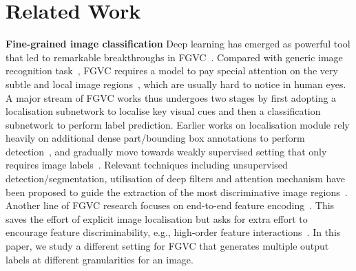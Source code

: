 \documentclass[final]{cvpr}
\newcommand{\keypoint}[1]{\vspace{0.05cm}\noindent\textbf{#1}\quad}
\begin{document}
\vspace{-2mm}
\section{Related Work}


\keypoint{Fine-grained image classification} Deep learning has emerged as powerful tool that led to remarkable breakthroughs in FGVC~\cite{zhang2016weakly,yang2018learning,wei2019adversarial,lu2019using,chen2019destruction,zhuang2020learning,ji2020attention}. Compared with generic image recognition task~\cite{cornia2020meshed,wang2020dual}, FGVC requires a model to pay special attention on the very subtle and local image regions~\cite{yang2018learning,chang2020mc}, which are usually hard to notice in human eyes. 
A major stream of FGVC works thus undergoes two stages by first adopting a localisation subnetwork to localise key visual cues and then a classification subnetwork to perform label prediction. Earlier works on localisation module rely heavily on additional dense part/bounding box annotations to perform detection~\cite{berg2013poof, chai2013symbiotic}, and gradually move towards weakly supervised setting that only requires image labels~\cite{yang2018learning,chang2020mc}. 
Relevant techniques including unsupervised detection/segmentation, utilisation of deep filters and attention mechanism have been proposed to guide the extraction of the most discriminative image regions~\cite{xiao2015application,wang2018learning,huang2020interpretable}. Another line of FGVC research focuses on end-to-end feature encoding~\cite{dubey2018pairwise,sun2018multi,sun2019fine}. This saves the effort of explicit image localisation but asks for extra effort to encourage feature discriminability, e.g., high-order feature interactions~\cite{lin2015bilinear,zheng2019learning}. In this paper, we study a different setting for FGVC that generates multiple output labels at different granularities for an image. 
\end{document}
